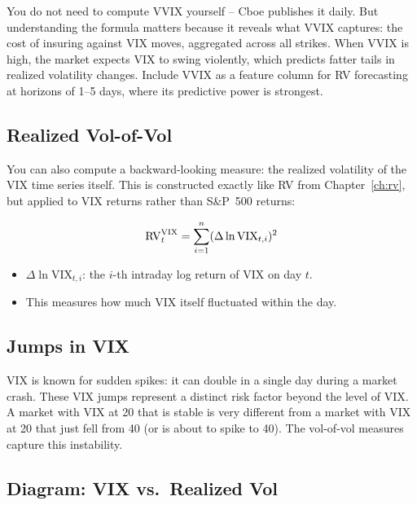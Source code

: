 \begin{projectconnection}
You do not need to compute VVIX yourself -- Cboe publishes it daily.
But understanding the formula matters because it reveals what VVIX captures: the cost of insuring against VIX moves, aggregated across all strikes.
When VVIX is high, the market expects VIX to swing violently, which predicts fatter tails in realized volatility changes.
Include VVIX as a feature column for RV forecasting at horizons of 1--5 days, where its predictive power is strongest.
\end{projectconnection}

\subsection{Realized Vol-of-Vol}

You can also compute a backward-looking measure: the realized volatility of the VIX time series itself.
This is constructed exactly like RV from Chapter~\ref{ch:rv}, but applied to VIX returns rather than S\&P~500 returns:

\begin{equation}
  \operatorname{RV}^{\text{VIX}}_t = \sum_{i=1}^{n} (\Delta \ln \text{VIX}_{t,i})^2
  \label{eq:rv-vix}
\end{equation}
\begin{itemize}[nosep]
  \item $\Delta \ln \text{VIX}_{t,i}$: the $i$-th intraday log return of VIX on day $t$.
  \item This measures how much VIX itself fluctuated within the day.
\end{itemize}

\subsection{Jumps in VIX}

VIX is known for sudden spikes: it can double in a single day during a market crash.
These VIX jumps represent a distinct risk factor beyond the level of VIX.
A market with VIX at 20 that is stable is very different from a market with VIX at 20 that just fell from 40 (or is about to spike to 40).
The vol-of-vol measures capture this instability.

\subsection{Diagram: VIX vs.\ Realized Vol}

